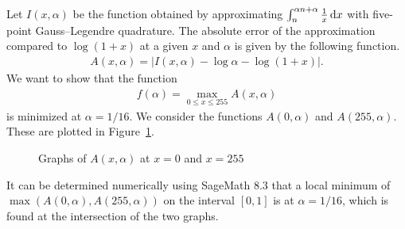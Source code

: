 Let $I\left(x,\alpha\right)$ be the function obtained by approximating $\int_{n}^{\alpha n + \alpha}{\frac{1}{x}\mathop{}\!\mathrm{d} x}$ with five-point Gauss--Legendre quadrature. The absolute error of the approximation compared to $\log{\left(1+x\right)}$ at a given $x$ and $\alpha$ is given by the following function.
\begin{align*}
	A\left(x,\alpha\right) = \left| I\left(x,\alpha\right) - \log\alpha - \log{\left(1+x\right)}\right|.
\end{align*}
We want to show that the function
\begin{align*}
	f\left(\alpha\right) = \max_{0\leq x \leq 255}{A\left(x,\alpha\right)}
\end{align*}
is minimized at $\alpha = 1/16$.
We consider the functions $A\left(0,\alpha\right)$ and $A\left(255,\alpha\right)$. These are plotted in Figure~\ref{fig:endpoint_plot}.
\begin{figure}[!ht]
	\centering
	\caption{Graphs of $A\left(x,\alpha\right)$ at $x=0$ and $x=255$}
	\label{fig:endpoint_plot}
\end{figure}

It can be determined numerically using SageMath 8.3 that a local minimum of $\max\left(A\left(0,\alpha\right),A\left(255,\alpha\right)\right)$ on the interval $[0,1]$ is at $\alpha = 1/16$, which is found at the intersection of the two graphs.

